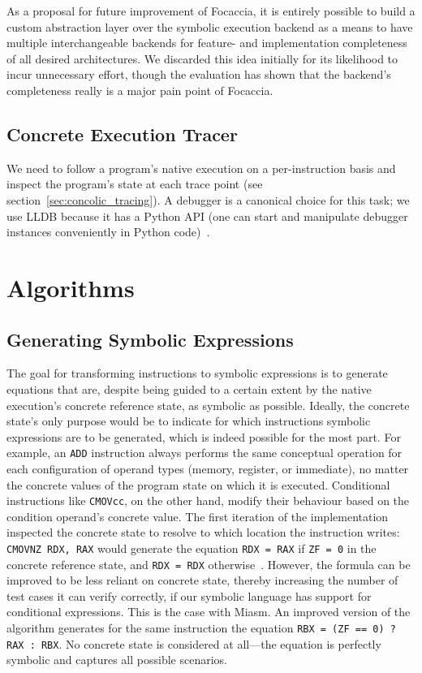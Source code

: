 As a proposal for future improvement of Focaccia, it is entirely possible to build a custom abstraction layer over the
symbolic execution backend as a means to have multiple interchangeable backends for feature- and implementation
completeness of all desired architectures. We discarded this idea initially for its likelihood to incur unnecessary
effort, though the evaluation has shown that the backend's completeness really is a major pain point of Focaccia.

\subsection{Concrete Execution Tracer}

We need to follow a program's native execution on a per-instruction basis and inspect the program's state at each trace
point (see section~\ref{sec:concolic_tracing}). A debugger is a canonical choice for this task; we use LLDB because it
has a Python API (one can start and manipulate debugger instances conveniently in Python code)~\cite{lldb2024Apr}.

\section{Algorithms}\label{sec:algorithms}

\subsection{Generating Symbolic Expressions}\label{sec:symb_expr_impl}

The goal for transforming instructions to symbolic expressions is to generate equations that are, despite being guided
to a certain extent by the native execution's concrete reference state, as symbolic as possible. Ideally, the concrete
state's only purpose would be to indicate for which instructions symbolic expressions are to be generated, which is
indeed possible for the most part. For example, an \texttt{ADD} instruction always performs the same conceptual
operation for each configuration of operand types (memory, register, or immediate), no matter the concrete values of the
program state on which it is executed. Conditional instructions like \texttt{CMOVcc}, on the other hand, modify their
behaviour based on the condition operand's concrete value. The first iteration of the implementation inspected the
concrete state to resolve to which location the instruction writes: \texttt{CMOVNZ RDX, RAX} would generate the equation
\texttt{RDX = RAX} if \texttt{ZF = 0} in the concrete reference state, and \texttt{RDX = RDX}
otherwise~\cite{Intel2023DeveloperManualVol1}.  However, the formula can be improved to be less reliant on concrete
state, thereby increasing the number of test cases it can verify correctly, if our symbolic language has support for
conditional expressions. This is the case with Miasm. An improved version of the algorithm generates for the same
instruction the equation \texttt{RBX = (ZF == 0) ? RAX : RBX}. No concrete state is considered at all---the equation is
perfectly symbolic and captures all possible scenarios.

